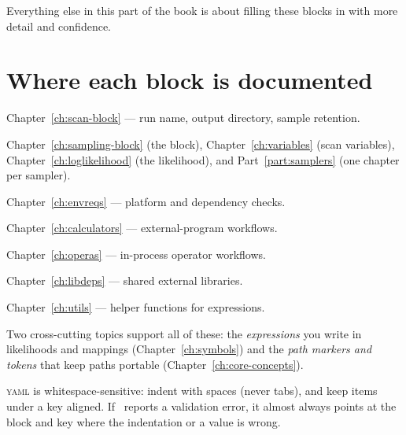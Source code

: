 \noindent Everything else in this part of the book is about filling these blocks in with more
detail and confidence.

\section{Where each block is documented}
\label{sec:block-map}

\begin{description}[style=nextline, leftmargin=1.2em]
  \item[\yamlkey{Scan}] Chapter~\ref{ch:scan-block} --- run name, output directory, sample
        retention.
  \item[\yamlkey{Sampling}] Chapter~\ref{ch:sampling-block} (the block),
        Chapter~\ref{ch:variables} (scan variables), Chapter~\ref{ch:loglikelihood}
        (the likelihood), and Part~\ref{part:samplers} (one chapter per sampler).
  \item[\yamlkey{EnvReqs}] Chapter~\ref{ch:envreqs} --- platform and dependency checks.
  \item[\yamlkey{Calculators}] Chapter~\ref{ch:calculators} --- external-program workflows.
  \item[\yamlkey{Operas}] Chapter~\ref{ch:operas} --- in-process operator workflows.
  \item[\yamlkey{LibDeps}] Chapter~\ref{ch:libdeps} --- shared external libraries.
  \item[\yamlkey{Utils}] Chapter~\ref{ch:utils} --- helper functions for expressions.
\end{description}

\noindent Two cross-cutting topics support all of these: the \emph{expressions} you write in
likelihoods and mappings (Chapter~\ref{ch:symbols}) and the \emph{path markers and tokens}
that keep paths portable (Chapter~\ref{ch:core-concepts}).

\begin{jtip}
\textsc{yaml} is whitespace-sensitive: indent with spaces (never tabs), and keep items under a
key aligned. If \Jarvis\ reports a validation error, it almost always points at the block and
key where the indentation or a value is wrong.
\end{jtip}
